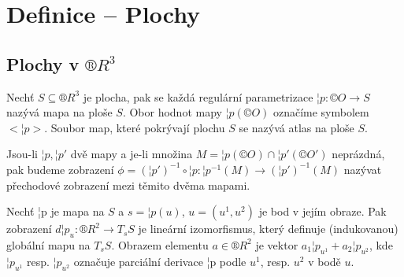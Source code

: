 \documentclass[12pt]{article}                   %
\begin{document}
\section{Definice -- Plochy}
    \subsection{Plochy v $®R^3$}
        \begin{definice}
            Nechť $S \subseteq ®R^3$ je plocha, pak se každá regulární parametrizace $¦p: ©O \rightarrow S$ nazývá mapa na ploše $S$. Obor hodnot mapy $¦p(©O)$ označíme symbolem $<¦p>$. Soubor map, které pokrývají plochu $S$ se nazývá atlas na ploše $S$.

            Jsou-li $¦p, ¦p'$ dvě mapy a je-li množina $M = ¦p(©O) \cap ¦p'(©O')$ neprázdná, pak budeme zobrazení $\phi = (¦p')^{-1} \circ ¦p: ¦p^{-1}(M) \rightarrow (¦p')^{-1}(M)$ nazývat přechodové zobrazení mezi těmito dvěma mapami.
        \end{definice}

        \begin{definice}
            Nechť ¦p je mapa na $S$ a $s = ¦p(u)$, $u = (u^1, u^2)$ je bod v jejím obraze. Pak zobrazení $d¦p_u: ®R^2 \rightarrow T_sS$ je lineární izomorfismus, který definuje (indukovanou) globální mapu na $T_sS$. Obrazem elementu $a \in ®R^2$ je vektor $a_1¦p_{u^1} + a_2¦p_{u^2}$, kde $¦p_{u^1}$ resp. $¦p_{u^2}$ označuje parciální derivace ¦p podle $u^1$, resp. $u^2$ v bodě $u$.
        \end{definice}
\end{document}
